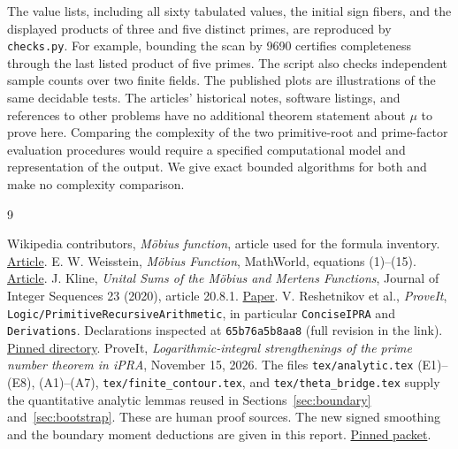 The value lists, including all sixty tabulated values, the initial sign
fibers, and the displayed products of three and five distinct primes,
are reproduced by \texttt{checks.py}. For example, bounding the scan
by 9690 certifies completeness through the last listed product of five
primes. The script also checks independent sample counts over two finite
fields. The published plots are illustrations of the same decidable
tests. The articles' historical notes, software listings, and references
to other problems have no additional theorem statement about $\mu$ to
prove here. Comparing the complexity of the two primitive-root and
prime-factor evaluation procedures would require a specified computational
model and representation of the output. We give exact bounded algorithms
for both and make no complexity comparison.

\begin{thebibliography}{9}\raggedright
{} Wikipedia contributors, \emph{Möbius function}, article
used for the formula inventory. \href{https://en.wikipedia.org/wiki/M\%C3\%B6bius_function}{Article}.
 E. W. Weisstein, \emph{Möbius Function}, MathWorld,
equations (1)--(15). \href{https://mathworld.wolfram.com/MoebiusFunction.html}{Article}.
 J. Kline, \emph{Unital Sums of the Möbius and Mertens Functions},
Journal of Integer Sequences 23 (2020), article 20.8.1.
\href{https://cs.uwaterloo.ca/journals/JIS/VOL23/Kline/kline4.html}{Paper}.
 V. Reshetnikov et al., \emph{ProveIt},
\texttt{Logic/PrimitiveRecursiveArithmetic}, in particular
\texttt{ConciseIPRA} and \texttt{Derivations}. Declarations inspected at
\texttt{65b76a5b8aa8} (full revision in the link).
\href{https://github.com/VladimirReshetnikov/ProveIt/tree/65b76a5b8aa87ecad4103c2d287eff5660d3c84c/Logic/PrimitiveRecursiveArithmetic}{Pinned directory}.
 ProveIt, \emph{Logarithmic-integral strengthenings of the
prime number theorem in iPRA}, November 15, 2026.
The files \texttt{tex/analytic.tex} (E1)--(E8), (A1)--(A7),
\texttt{tex/finite\_contour.tex}, and \texttt{tex/theta\_bridge.tex}
supply the quantitative analytic lemmas reused in
Sections~\ref{sec:boundary} and~\ref{sec:bootstrap}.
These are human proof sources. The new signed smoothing and the boundary
moment deductions are given in this report.
\href{https://github.com/VladimirReshetnikov/ProveIt/tree/a9c0f1949be61679ed2e219b97dc42ecb7ae91a9/Logic/PrimitiveRecursiveArithmetic/docs/proofs/analytic-number-theory/pnt_li_ipra_2026-11-15}{Pinned packet}.
\end{thebibliography}
